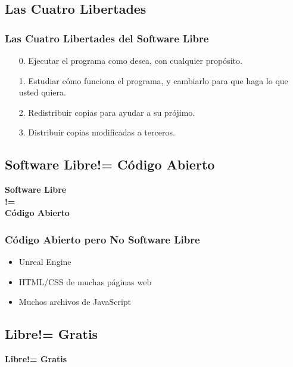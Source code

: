\documentclass[xetex]{beamer}
\begin{document}
\subsection{Las Cuatro Libertades}
\begin{frame}
    \frametitle{Las Cuatro Libertades del Software Libre}
    \pause{}
    \begin{enumerate}[<+->]
        \item[0.] Ejecutar el programa como desea, con cualquier propósito.
        \item[1.] Estudiar cómo funciona el programa, y cambiarlo para que haga lo que usted quiera.
        \item[2.] Redistribuir copias para ayudar a su prójimo.
        \item[3.] Distribuir copias modificadas a terceros.
    \end{enumerate}
\end{frame}


\subsection{Software Libre\texttt{}!= Código Abierto}
\begin{frame}
    \centering \Huge \textbf{Software Libre\\!=\\Código Abierto}
\end{frame}


\begin{frame}[t]
    \frametitle{Código Abierto pero No Software Libre}
    \pause{}
    \begin{itemize}[<+->]
        \item Unreal Engine
        \item HTML/CSS de muchas páginas web
        \item Muchos archivos de JavaScript
    \end{itemize}
\end{frame}


\subsection{Libre\texttt{}!= Gratis}
\begin{frame}
    \centering \Huge \textbf{Libre\texttt{}!= Gratis}
\end{frame}
\end{document}
